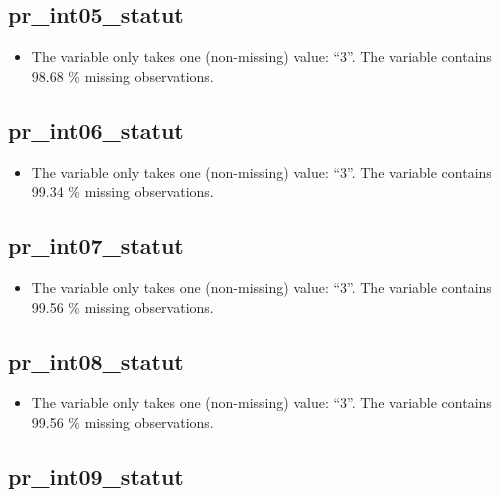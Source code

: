 \documentclass[
  letterpaper,
  DIV=11,
  numbers=noendperiod]{scrartcl}
\providecommand{\tightlist}{%
  \setlength{\itemsep}{0pt}\setlength{\parskip}{0pt}}
\begin{document}
\subsection{pr\_int05\_statut}\label{pr_int05_statut}

\begin{itemize}
\tightlist
\item
  The variable only takes one (non-missing) value: ``3''. The variable
  contains 98.68 \% missing observations.
\end{itemize}

\fullline

\subsection{pr\_int06\_statut}\label{pr_int06_statut}

\begin{itemize}
\tightlist
\item
  The variable only takes one (non-missing) value: ``3''. The variable
  contains 99.34 \% missing observations.
\end{itemize}

\fullline

\subsection{pr\_int07\_statut}\label{pr_int07_statut}

\begin{itemize}
\tightlist
\item
  The variable only takes one (non-missing) value: ``3''. The variable
  contains 99.56 \% missing observations.
\end{itemize}

\fullline

\subsection{pr\_int08\_statut}\label{pr_int08_statut}

\begin{itemize}
\tightlist
\item
  The variable only takes one (non-missing) value: ``3''. The variable
  contains 99.56 \% missing observations.
\end{itemize}

\fullline

\subsection{pr\_int09\_statut}\label{pr_int09_statut}
\end{document}
